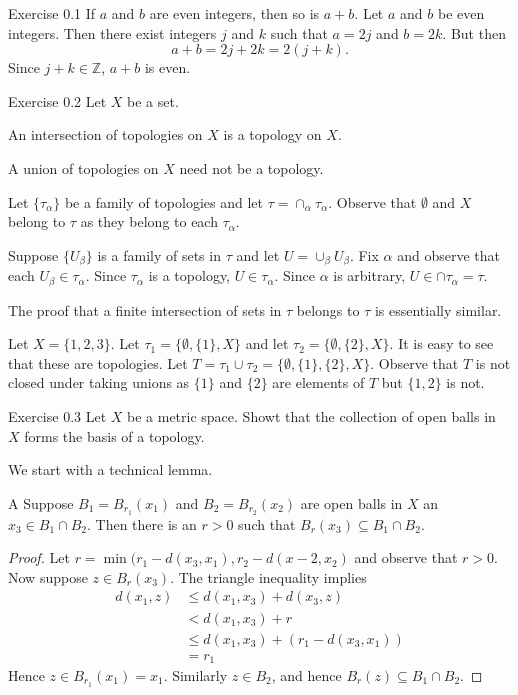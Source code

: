 \documentclass[minion]{homework}
\newcommand{\Ints}{\ensuremath{\mathbb Z}} %
\let\ZZ\Ints
\begin{document}
\begin{aproblems}

\hproblem Exercise 0.1 
If $a$ and $b$ are even integers, then so is $a+b$.
\solution
Let $a$ and $b$ be even integers.  Then there exist integers
$j$ and $k$ such that $a=2j$ and $b=2k$.  But then
\begin{equation}
a+b = 2j+ 2k = 2(j+k).
\end{equation}
Since $j+k\in\Ints$, $a+b$ is even.

\hproblem Exercise 0.2 
Let $X$ be a set.
\begin{subproblems}
\item An intersection of topologies on $X$ is a topology on $X$.
\item A union of topologies on $X$ need not be a topology.
\end{subproblems}
\subsol
Let $\{\tau_\alpha\}$ be a family of topologies and let $\tau=\cap_\alpha \tau_\alpha$.  
Observe that $\emptyset$ and $X$ belong to $\tau$ as they belong to each $\tau_\alpha$.

Suppose $\{U_\beta\}$ is a family of sets in $\tau$ and let $U=\cup_\beta U_\beta$. 
Fix $\alpha$ and observe that each $U_\beta\in \tau_\alpha$. Since $\tau_\alpha$
is a topology, $U\in\tau_\alpha$.  Since $\alpha$ is arbitrary, $U\in\cap\tau_\alpha=\tau$.

The proof that a finite intersection of sets in $\tau$ belongs to $\tau$ is essentially similar.

\subsol
Let $X=\{1,2,3\}$.  Let $\tau_1 = \{\emptyset, \{1\}, X\}$ and let $\tau_2 = \{\emptyset, \{2\}, X\}$.
It is easy to see that these are topologies.
Let $T=\tau_1\cup \tau_2 = \{\emptyset, \{1\}, \{2\}, X\}$.   Observe that $T$ is not closed under
taking unions as $\{1\}$ and $\{2\}$ are elements of $T$ but $\{1,2\}$ is not.

\hproblem Exercise 0.3 
Let $X$ be a metric space.  Showt that 
the collection of open balls in $X$ forms the basis of a topology.

\solution
We start with a technical lemma.
\begin{lemma}{A}\label{lem:DAMrefine}  
Suppose $B_1=B_{r_1}(x_1)$ and $B_2=B_{r_2}(x_2)$ are 
open balls in $X$ an $x_3\in B_1\cap B_2$.  Then there is an $r>0$ such
that $B_r(x_3)\subseteq B_1\cap B_2$.
\end{lemma}
\begin{proof}
Let $r = \min(r_1-d(x_3,x_1),r_2-d(x-2,x_2)$ and observe that $r>0$.  Now suppose
$z\in B_{r}(x_3)$.  The triangle inequality implies
\begin{align*} 
d(x_1,z)&\le d(x_1,x_3) + d(x_3,z) \\
&< d(x_1,x_3) + r \\
&\le d(x_1,x_3) + ( r_1-d(x_3,x_1) ) \\
&= r_1
\end{align*}
Hence $z\in B_{r_1}(x_1)=x_1$.  Similarly $z\in B_2$, and hence $B_r(z)\subseteq B_1\cap B_2$.
\end{proof}


\end{aproblems}
\end{document}
